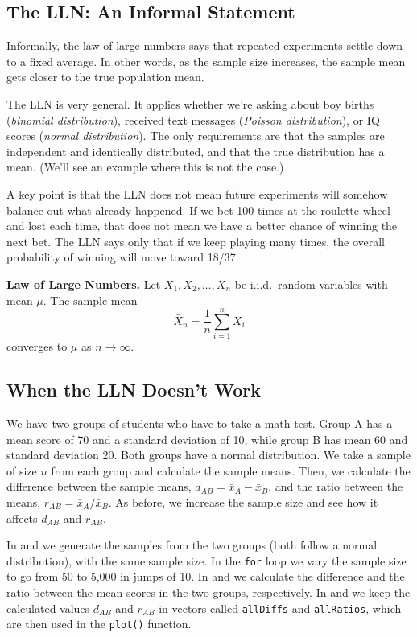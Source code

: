 \subsection{The LLN: An Informal Statement}
Informally, the law of large numbers says that repeated experiments settle
down to a fixed average. In other words, as the sample size increases, the
sample mean gets closer to the true population mean.

The LLN is very general. It applies whether we're asking about boy births
(\emph{binomial distribution}), received text messages
(\emph{Poisson distribution}), or IQ scores
(\emph{normal distribution}). The only requirements are that the samples are
independent and identically distributed, and that the true distribution has a
mean. (We'll see an example where this is not the case.)

A key point is that the LLN does not mean future experiments will somehow
balance out what already happened. If we bet 100 times at the roulette wheel
and lost each time, that does not mean we have a better chance of winning the
next bet. The LLN says only that if we keep playing many times, the overall
probability of winning will move toward 18/37.

\medskip
\noindent\textbf{Law of Large Numbers.} Let $X_1, X_2, \ldots, X_n$ be
i.i.d.\ random variables with mean $\mu$. The sample mean
\[
  \bar{X}_n = \frac{1}{n}\sum_{i=1}^{n} X_i
\]
converges to $\mu$ as $n \to \infty$.
\medskip

\subsection{When the LLN Doesn't Work}
We have two groups of students who have to take a math test. Group A has a mean
score of 70 and a standard deviation of 10, while group B has mean 60 and
standard deviation 20. Both groups have a normal distribution.  We take a
sample of size $n$ from each group and calculate the sample means. Then, we
calculate the difference between the sample means,
$d_{AB}=\bar{x}_A-\bar{x}_B$, and the ratio between the means,
$r_{AB}=\bar{x}_A/\bar{x}_B$.
As before, we increase the sample size and see how it affects $d_{AB}$ and $r_{AB}$.


In  and  we generate the samples from the two groups
(both follow a normal distribution), with the same sample size. In the \lstinline{for} loop
we vary the sample size to go from 50 to 5,000 in jumps of 10. In 
and  we calculate the difference and the ratio between the mean
scores in the two groups, respectively. In  and  we
keep the calculated values $d_{AB}$ and $r_{AB}$ in vectors called
\lstinline{allDiffs} and \lstinline{allRatios}, which are then used in the
\lstinline{plot()} function.


